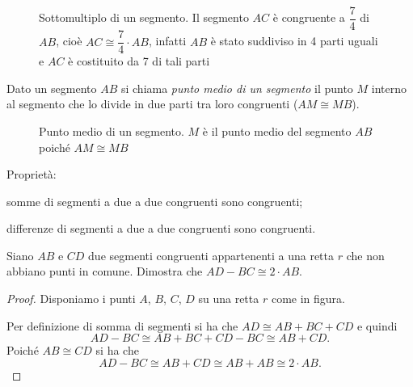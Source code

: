 \begin{inaccessibleblock}
 \begin{figure}[htb]
\centering
\caption{Sottomultiplo di un segmento. Il segmento \(AC\) è congruente 
a \(\dfrac{7}{4}\) di \(AB\), cioè \(AC\cong\dfrac{7}{4}\cdot AB\), infatti 
\(AB\) è stato suddiviso in 4 parti uguali e \(AC\) è costituito da 7 di 
tali parti}
\end{figure}
\end{inaccessibleblock}

\begin{definizione}
Dato un segmento \(AB\) si chiama \emph{punto medio di un segmento} il 
punto \(M\) interno al segmento che lo divide in due parti tra loro 
congruenti (\(AM\cong MB\)).
\end{definizione}


\begin{inaccessibleblock}
 \begin{figure}[htb]
\centering
\caption{Punto medio di un segmento. \(M\) è il punto medio del 
segmento \(AB\) poiché \(AM\cong MB\)}
\end{figure}
\end{inaccessibleblock}

Proprietà:
\begin{itemize*}
\item somme di segmenti a due a due congruenti sono congruenti; 
\item differenze di segmenti a due a due congruenti sono congruenti.
\end{itemize*}

\begin{exrig}
\begin{esempio}
Siano \(AB\) e \(CD\) due segmenti congruenti appartenenti a una retta 
\(r\) che non abbiano punti in comune. Dimostra che \(AD-BC\cong 2\cdot 
AB\).
\begin{proof}
Disponiamo i punti \(A\), \(B\), \(C\), \(D\) su una retta \(r\) come in figura.

\begin{inaccessibleblock}
 \begin{figure}[htb]
\centering
\end{figure}
\end{inaccessibleblock}

Per definizione di somma di segmenti si ha che \(AD\cong AB+BC+CD\) e 
quindi
\[AD-BC\cong AB+BC+CD-BC\cong AB+CD.\]
Poiché \(AB\cong CD\) si ha che
\[AD-BC\cong AB+CD\cong AB+AB\cong 2\cdot AB.\]
\end{proof}
\end{esempio}
\end{exrig}


